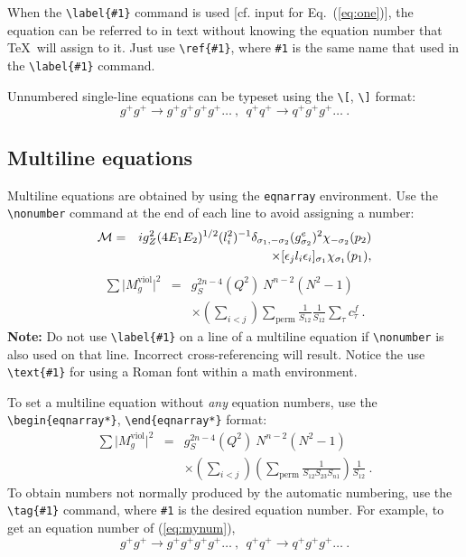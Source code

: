 \documentclass[%
 aip,
 jmp,%
 amsmath,amssymb,
 reprint,%
]{revtex4-1}
\begin{document}
When the \verb+\label{#1}+ command is used [cf. input for
Eq.~(\ref{eq:one})], the equation can be referred to in text without
knowing the equation number that \TeX\ will assign to it. Just
use \verb+\ref{#1}+, where \verb+#1+ is the same name that used in
the \verb+\label{#1}+ command.

Unnumbered single-line equations can be typeset
using the \verb+\[+, \verb+\]+ format:
\[g^+g^+ \rightarrow g^+g^+g^+g^+ \dots ~,~~q^+q^+\rightarrow
q^+g^+g^+ \dots ~. \]

\subsection{Multiline equations}

Multiline equations are obtained by using the \verb+eqnarray+
environment.  Use the \verb+\nonumber+ command at the end of each line
to avoid assigning a number:
\begin{eqnarray}
{\cal M}=&&ig_Z^2(4E_1E_2)^{1/2}(l_i^2)^{-1}
\delta_{\sigma_1,-\sigma_2}
(g_{\sigma_2}^e)^2\chi_{-\sigma_2}(p_2)\nonumber\\
&&\times
[\epsilon_jl_i\epsilon_i]_{\sigma_1}\chi_{\sigma_1}(p_1),
\end{eqnarray}
\begin{eqnarray}
\sum \vert M^{\text{viol}}_g \vert ^2&=&g^{2n-4}_S(Q^2)~N^{n-2}
        (N^2-1)\nonumber \\
 & &\times \left( \sum_{i<j}\right)
  \sum_{\text{perm}}
 \frac{1}{S_{12}}
 \frac{1}{S_{12}}
 \sum_\tau c^f_\tau~.
\end{eqnarray}
\textbf{Note:} Do not use \verb+\label{#1}+ on a line of a multiline
equation if \verb+\nonumber+ is also used on that line. Incorrect
cross-referencing will result. Notice the use \verb+\text{#1}+ for
using a Roman font within a math environment.

To set a multiline equation without \emph{any} equation
numbers, use the \verb+\begin{eqnarray*}+,
\verb+\end{eqnarray*}+ format:
\begin{eqnarray*}
\sum \vert M^{\text{viol}}_g \vert ^2&=&g^{2n-4}_S(Q^2)~N^{n-2}
        (N^2-1)\\
 & &\times \left( \sum_{i<j}\right)
 \left(
  \sum_{\text{perm}}\frac{1}{S_{12}S_{23}S_{n1}}
 \right)
 \frac{1}{S_{12}}~.
\end{eqnarray*}
To obtain numbers not normally produced by the automatic numbering,
use the \verb+\tag{#1}+ command, where \verb+#1+ is the desired
equation number. For example, to get an equation number of
(\ref{eq:mynum}),
\begin{equation}
g^+g^+ \rightarrow g^+g^+g^+g^+ \dots ~,~~q^+q^+\rightarrow
q^+g^+g^+ \dots ~. \tag{2.6$'$}\label{eq:mynum}
\end{equation}
\end{document}
